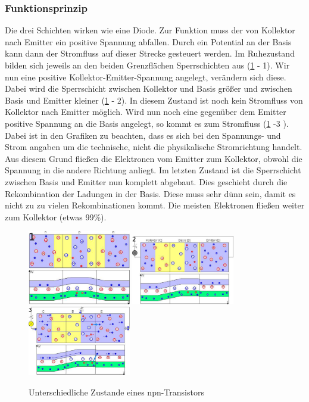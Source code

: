	\subsubsection{Funktionsprinzip}
	Die drei Schichten wirken wie eine Diode. Zur Funktion muss der von Kollektor nach Emitter ein positive Spannung abfallen. Durch ein Potential an der Basis kann dann der Stromfluss auf dieser Strecke gesteuert werden.
	Im Ruhezustand bilden sich jeweils an den beiden Grenzflächen Sperrschichten aus (\ref{10_zustände} - 1). Wir nun eine positive Kollektor-Emitter-Spannung angelegt, verändern sich diese. Dabei wird die Sperrschicht zwischen Kollektor und Basis größer und zwischen Basis und Emitter kleiner (\ref{10_zustände} - 2). In diesem Zustand ist noch kein Stromfluss von Kollektor nach Emitter möglich. Wird nun noch eine gegenüber dem Emitter positive Spannung an die Basis angelegt, so kommt es zum Stromfluss (\ref{10_zustände} -3 ). Dabei ist in den Grafiken zu beachten, dass es sich bei den Spannungs- und Strom angaben um die technische, nicht die physikalische Stromrichtung handelt. Aus diesem Grund fließen die Elektronen vom Emitter zum Kollektor, obwohl die Spannung in die andere Richtung anliegt. Im letzten Zustand ist die Sperrschicht zwischen Basis und Emitter nun komplett abgebaut. Dies geschieht durch die Rekombination der Ladungen in der Basis. Diese muss sehr dünn sein, damit es nicht zu zu vielen Rekombinationen kommt. Die meisten Elektronen fließen weiter zum Kollektor (etwas 99\%).
	\begin{figure}[h]
		\centering
		\includegraphics[width=0.4\textwidth]{Kapitel/Kap10/zustand_1.png}
		\includegraphics[width=0.4\textwidth]{Kapitel/Kap10/zustand_2.png}
		\includegraphics[width=0.4\textwidth]{Kapitel/Kap10/zustand_3.png}
		\caption{Unterschiedliche Zustande eines npn-Transistors}
		\label{10_zustände}
	\end{figure}
